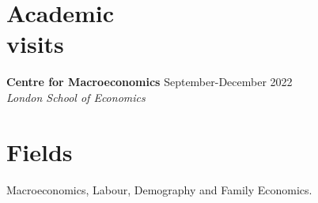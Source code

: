 \documentclass[margin]{res} %
\begin{document}
\begin{resume}
\section{Academic \\ visits}
{\bf Centre for Macroeconomics} \hfill September-December 2022  \\
{\sl London School of Economics}

%	
%	
%	
%	

\section{Fields}

Macroeconomics, Labour, Demography and Family Economics.


\end{resume}
\end{document}
